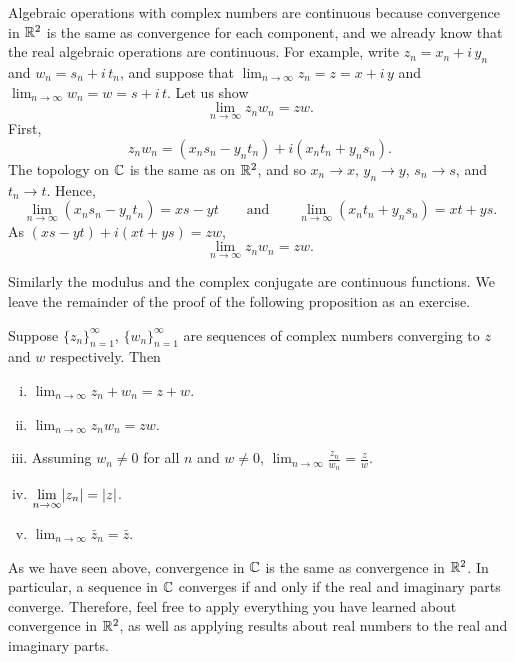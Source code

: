 Algebraic operations with complex numbers are
continuous because convergence in 
${\mathbb{R}}^2$ is the same as convergence for each component, and we already know
that the real algebraic operations are continuous.  For example,
write $z_n = x_n + i\,y_n$ and
$w_n = s_n + i\,t_n$, and suppose that
$\lim_{n\to\infty} z_n = z = x+i\,y$ and $\lim_{n\to\infty} w_n = w = s+i\,t$.
Let us show
\begin{equation*}
\lim_{n\to\infty} z_n w_n = zw .
\end{equation*}
First,
\begin{equation*}
z_n w_n = (x_ns_n-y_nt_n) + i(x_nt_n+y_ns_n) .
\end{equation*}
The topology on ${\mathbb{C}}$ is the same as on ${\mathbb{R}}^2$, and so
$x_n \to x$, $y_n \to y$, $s_n \to s$, and $t_n \to t$.
Hence,
\begin{equation*}
\lim_{n\to\infty} (x_ns_n-y_nt_n) = xs-yt \qquad \text{and} \qquad
\lim_{n\to\infty} (x_nt_n+y_ns_n) = xt+ys .
\end{equation*}
As
$(xs-yt)+i(xt+ys) = zw$,
\begin{equation*}
\lim_{n\to\infty} z_n w_n = zw .
\end{equation*}

Similarly the modulus and the complex conjugate are continuous functions.  We
leave the remainder of the proof of the following proposition as an exercise.

\begin{prop} \label{prop:continuityofcomplex}
Suppose $\{ z_n \}_{n=1}^\infty$, $\{ w_n \}_{n=1}^\infty$ are sequences of complex numbers converging
to $z$ and $w$ respectively.  Then
\begin{enumerate}[(i)]
\item
$\displaystyle \lim_{n\to \infty} z_n + w_n = z + w$.
\item
$\displaystyle \lim_{n\to \infty} z_n w_n = z w$.
\item
Assuming $w_n \not= 0$ for all $n$ and $w\not= 0$,
$\displaystyle \lim_{n\to \infty} \frac{z_n}{w_n} = \frac{z}{w}$.
\item
$\displaystyle \lim_{n\to \infty} \lvert {z_n} \rvert = \lvert {z} \rvert$.
\item
$\displaystyle \lim_{n\to \infty} \bar{z}_n = \bar{z}$.
\end{enumerate}
\end{prop}

As we have seen above, convergence in ${\mathbb{C}}$ is the same as convergence in
${\mathbb{R}}^2$.  In particular, a sequence in ${\mathbb{C}}$ converges if and only if
the real and imaginary parts converge.  Therefore, feel free to apply
everything you have learned about convergence in ${\mathbb{R}}^2$, as well as
applying results about real numbers to the real and imaginary parts.


